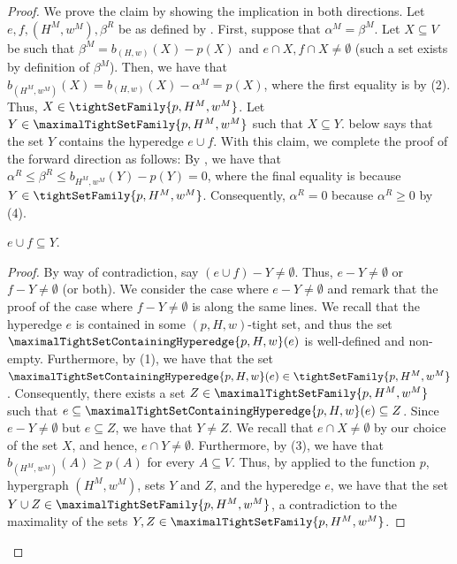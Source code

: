 \begin{proof}
    We prove the claim by showing the implication in both directions. Let $e, f, (H^M, w^M), \beta^R$ be as defined by . 
    First, suppose that $\alpha^M = \beta^M$. Let $X \subseteq V$ be such that $\beta^M = b_{(H,w)}(X) - p(X)$ and $e\cap X, f\cap X \not = \emptyset$ (such a set exists by definition of $\beta^M$). Then, we have that
    $b_{(H^M,w^M)}(X) = b_{(H,w)}(X) - \alpha^M = p(X)$, where the first equality is by (2). Thus, $X \in \tightSetFamily{p, H^M, w^M}$. Let $Y \in \maximalTightSetFamily{p, H^M, w^M}$ such that $X \subseteq Y$.  below says that the set $Y$ contains the hyperedge $e \cup f$. With this claim, we complete the proof of the forward direction as follows: By , we have that $\alpha^R \leq \beta^R \leq b_{H^M,w^M}(Y) - p(Y) = 0$, where the final equality is because $Y \in \tightSetFamily{p, H^M, w^M}$. Consequently, $\alpha^R = 0$ because $\alpha^R \geq 0$ by (4). 
\begin{claim}\label{claim:WeakToStrong:new-tight-set-containing-e-and-f}
       $e \cup f \subseteq Y$.
    \end{claim}
    \begin{proof}
    By way of contradiction, say $(e\cup f) - Y \not = \emptyset$. Thus, $e - Y \not = \emptyset$ or $f - Y \not = \emptyset$ (or both). We consider the case where $e - Y \not = \emptyset$ and remark that the proof of the case where $f - Y \not = \emptyset$ is along the same lines.
        We recall that the hyperedge $e$ is contained in some $(p, H, w)$-tight set, and thus the set $\maximalTightSetContainingHyperedge{p, H, w}(e)$ is well-defined and non-empty. Furthermore, by (1), we have that the set $\maximalTightSetContainingHyperedge{p, H, w}(e) \in \tightSetFamily{p, H^M, w^M}$. Consequently, there exists a set $Z \in \maximalTightSetFamily{p, H^M, w^M}$ such that $e \subseteq \maximalTightSetContainingHyperedge{p, H, w}(e) \subseteq Z$. Since $e - Y \not = \emptyset$ but $e \subseteq Z$, we have that $Y \not = Z$.  We recall that $e \cap X \not = \emptyset$ by our choice of the set $X$, and hence, $e \cap Y \not = \emptyset$. Furthermore, by (3), we have that $b_{(H^M, w^M)}(A) \geq p(A)$ for every $A \subseteq V$. Thus, by  applied to the function $p$, hypergraph $(H^M, w^M)$, sets $Y$ and $Z$, and the hyperedge $e$, we have that the set $Y \cup Z \in \maximalTightSetFamily{p, H^M, w^M}$, a contradiction to the maximality of the sets $Y, Z \in \maximalTightSetFamily{p, H^M, w^M}$.
    \end{proof}
    

\end{proof}

